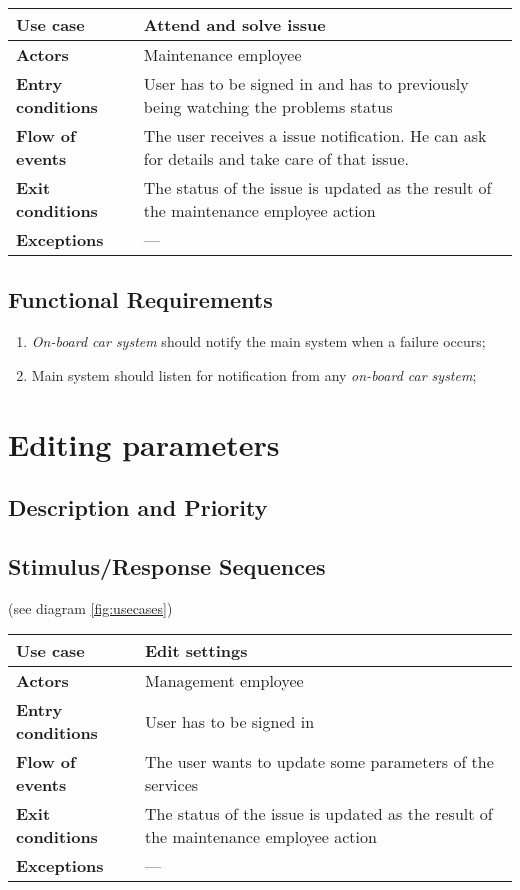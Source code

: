 \documentclass{scrreprt}
\begin{document}
\begin{center}
\begin{tabularx}{\columnwidth}{>{\bfseries}lX}
\toprule
Use case & Attend and solve issue\\
\midrule
Actors & Maintenance employee\\
\midrule
Entry conditions & User has to be signed in and has to previously being watching the problems status\\
\midrule
Flow of events & The user receives a issue notification. He can ask for details and take care of that issue.\\
\midrule
Exit conditions & The status of the issue is updated as the result of the maintenance employee action\\
\midrule
Exceptions & ---\\
\bottomrule
\end{tabularx}
\end{center}

\subsection{Functional Requirements}
\begin{enumerate}[label=R\arabic*.,resume]
\item \emph{On-board car system} should notify the main system when a failure occurs;
\item Main system should listen for notification from any \emph{on-board car system};

\end{enumerate}

\section{Editing parameters}
\subsection{Description and Priority}

\subsection{Stimulus/Response Sequences}
(see diagram \vref{fig:usecases})

\begin{center}
\begin{tabularx}{\columnwidth}{>{\bfseries}lX}
\toprule
Use case & Edit settings\\
\midrule
Actors & Management employee\\
\midrule
Entry conditions & User has to be signed in\\
\midrule
Flow of events & The user wants to update some parameters of the services\\
\midrule
Exit conditions & The status of the issue is updated as the result of the maintenance employee action\\
\midrule
Exceptions & ---\\
\bottomrule
\end{tabularx}
\end{center}
\end{document}
